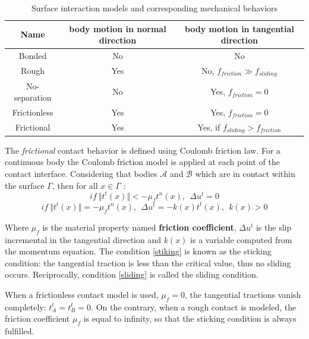 \begin{table}[H]

\begin{center}
\begin{tabular}{||c|c|c||}
\hline
Name & body motion in normal direction & body motion in tangential direction \\
\hline\hline
Bonded & No & No\\
\hline
Rough & Yes & No, $f_{friction} \gg f_{sliding}$ \\
\hline
No-separation & No & Yes,  $f_{friction} = 0$ \\
\hline
Frictionless & Yes & Yes, $f_{friction} = 0$ \\
\hline
Frictional & Yes & Yes, if $f_{sliding} > f_{friction}$\\
\hline
\end{tabular}
\caption{Surface interaction models and corresponding mechanical behaviors}
\label{contactB}
\end{center}
\end{table}

The \textit{frictional} contact behavior is defined using Coulomb friction law. For a continuous body the Coulomb friction model is applied at each point of the contact interface.
Considering that bodies $\mathcal{A}$ and $\mathcal{B}$ which are in contact within the surface $\Gamma$, then for all $x \in \Gamma$ :
\begin{equation}
\label{stiking}
if \ \Vert t^t(x) \Vert < -\mu_f t^n(x),\ \ \Delta u^t=0 
\end{equation}
\begin{equation}
\label{sliding}
if \ \Vert t^t(x) \Vert = -\mu_f t^n(x),\ \ \Delta u^t=-k(x)t^t(x),\ \ k(x)>0
\end{equation}

Where $\mu_f$ is the material property named \textbf{friction coefficient},  $\Delta u^t$ is the slip incremental in the tangential direction and $k(x)$ is a variable computed from the momentum equation. The condition \ref{stiking} is known as the sticking condition: the tangential traction is less than the critical value, thus no sliding occurs. Reciprocally, condition \ref{sliding} is called the sliding condition.

When a frictionless contact model is used, $\mu_f = 0$, the tangential tractions vanish completely: $t_A^t = t_B^t = 0$. On the contrary, when a rough contact is modeled, the friction coefficient $\mu_f$ is equal to infinity, so that the sticking condition is always fulfilled. 

